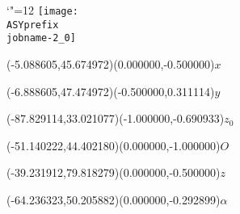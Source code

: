 \setlength{\unitlength}{1pt}%
\makeatletter%
\let\ASYencoding\f@encoding%
\let\ASYfamily\f@family%
\let\ASYseries\f@series%
\let\ASYshape\f@shape%
\makeatother%
{\catcode`"=12%
\texttt{[image: \\ASYprefix\\jobname-2\_0]}%
}%
%
\fontsize{6.000000}{7.200000}\selectfont%
\usefont{\ASYencoding}{\ASYfamily}{\ASYseries}{\ASYshape}%
\ASYalign(-5.088605,45.674972)(0.000000,-0.500000){$x$}%
%
\fontsize{6.000000}{7.200000}\selectfont%
\ASYalign(-6.888605,47.474972)(-0.500000,0.311114){$y$}%
%
\fontsize{6.000000}{7.200000}\selectfont%
\ASYalign(-87.829114,33.021077)(-1.000000,-0.690933){$z_0$}%
%
\fontsize{6.000000}{7.200000}\selectfont%
\ASYalign(-51.140222,44.402180)(0.000000,-1.000000){$O$}%
%
\fontsize{6.000000}{7.200000}\selectfont%
\ASYalign(-39.231912,79.818279)(0.000000,-0.500000){$z$}%
%
\fontsize{6.000000}{7.200000}\selectfont%
\ASYalign(-64.236323,50.205882)(0.000000,-0.292899){$\alpha$}%
